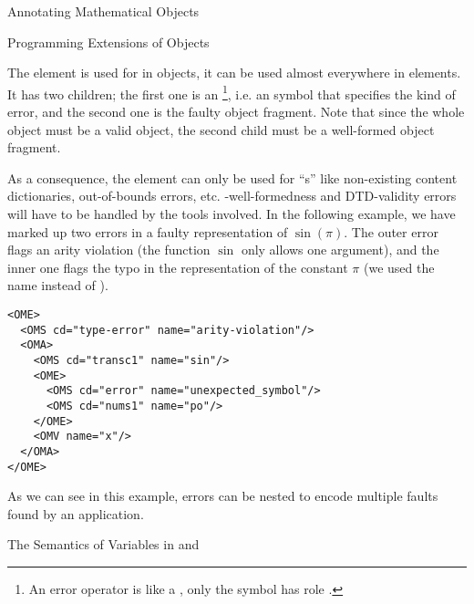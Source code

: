 \begin{omgroup}[id=annotating]{Annotating Mathematical Objects}
\begin{omgroup}[id=om.error]{Programming Extensions of {\openmath} Objects}
\begin{definition}[id=ome.def]
  The {} element is used for {} in
  {\openmath} objects, it can be used almost everywhere in {\openmath} elements. It has
  two children; the first one is an {}\footnote{An error operator
    is like a {}, only the symbol has role
    .}, i.e. an {\openmath} symbol that specifies the kind
  of error, and the second one is the faulty {\openmath} object fragment. Note that since
  the whole object must be a valid {\openmath} object, the second child must be a
  well-formed {\openmath} object fragment.
\end{definition}
As a consequence, the  element can only be used for
``{s}'' like non-existing content dictionaries, out-of-bounds
errors, etc.  {\xml}-well-formedness and DTD-validity errors will have to be handled by
the {\xml} tools involved. In the following example, we have marked up two errors in a
faulty representation of $\sin(\pi)$.  The outer error flags an arity violation (the
function $\sin$ only allows one argument), and the inner one flags the typo in the
representation of the constant $\pi$ (we used the name {} instead of
{}).

\begin{lstlisting}[label=ome,language=OpenMath,numbers=none,index={OME}]
<OME>
  <OMS cd="type-error" name="arity-violation"/>
  <OMA>
    <OMS cd="transc1" name="sin"/>
    <OME>
      <OMS cd="error" name="unexpected_symbol"/>
      <OMS cd="nums1" name="po"/>
    </OME>
    <OMV name="x"/>
  </OMA>
</OME>
\end{lstlisting}
  As we can see in this example, errors can be nested to encode multiple faults found by
  an {\openmath} application.

\end{omgroup}





\begin{module}[id=omml-semvar]
\begin{omgroup}[id=sem-var,short=Semantics of Variables]{The Semantics of Variables in
  \openmath and \cmathml}
 

\end{omgroup}
\end{module}
\end{omgroup}
